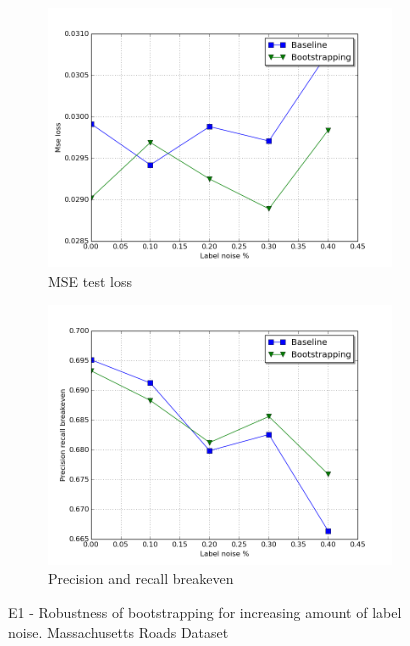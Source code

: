 \begin{figure}
\begin{subfigure}{0.48\textwidth}
\includegraphics[width=\linewidth]{figs/E3/E3_lc_noise.png}
\caption{MSE test loss} \label{fig:E1_boot_mass_loss}
\end{subfigure}
\hspace*{\fill} %
\begin{subfigure}{0.48\textwidth}
\includegraphics[width=\linewidth]{figs/E3/E3_pr_noise.png}
\caption{Precision and recall breakeven} \label{fig:E1_boot_mass_pr}
\end{subfigure}
\hspace*{\fill} %
\caption[E1 - Robustness of bootstrapping with  Massachusetts Roads Dataset]{E1 - Robustness of bootstrapping for increasing amount of label noise. Massachusetts Roads Dataset} \label{fig:E1_boot_mass}
\end{figure}

